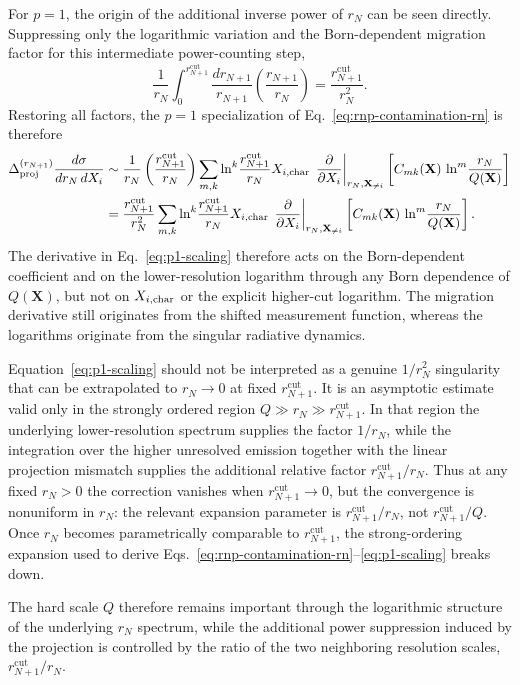 \documentclass[11pt]{article}
\newcommand{\rn}{r_N}
\newcommand{\rnp}{r_{N+1}}
\newcommand{\cut}{\mathrm{cut}}
\begin{document}
For \(p=1\), the origin of the additional inverse power of \(\rn\) can be seen directly. Suppressing only
the logarithmic variation and the Born-dependent migration factor for this intermediate power-counting step,
\[
\frac{1}{\rn}
\int_0^{\rnp^{\cut}}
\frac{d\rnp}{\rnp}
\left(\frac{\rnp}{\rn}\right)
=
\frac{\rnp^{\cut}}{\rn^2}.
\]
Restoring all factors, the \(p=1\) specialization of Eq.~\eqref{eq:rnp-contamination-rn} is therefore
\begin{align}
\Delta_{\rm proj}^{(\rnp)}
\frac{d\sigma}{d\rn\,dX_i}
&\sim
\frac{1}{\rn}
\left(\frac{\rnp^{\cut}}{\rn}\right)
\sum_{m,k}
\ln^k\!\frac{\rnp^{\cut}}{\rn}
X_{i,\rm char}\,
\left.
\frac{\partial}{\partial X_i}
\right|_{\rn,\mathbf X_{\neq i}}
\left[
C_{mk}(\mathbf X)\,
\ln^m\!\frac{\rn}{Q(\mathbf X)}
\right]
\nonumber\\
&=
\frac{\rnp^{\cut}}{\rn^2}
\sum_{m,k}
\ln^k\!\frac{\rnp^{\cut}}{\rn}
X_{i,\rm char}\,
\left.
\frac{\partial}{\partial X_i}
\right|_{\rn,\mathbf X_{\neq i}}
\left[
C_{mk}(\mathbf X)\,
\ln^m\!\frac{\rn}{Q(\mathbf X)}
\right].
\label{eq:p1-scaling}
\end{align}
The derivative in Eq.~\eqref{eq:p1-scaling} therefore acts on the Born-dependent coefficient and on the
lower-resolution logarithm through any Born dependence of \(Q(\mathbf X)\), but not on
\(X_{i,\rm char}\) or the explicit higher-cut logarithm. The migration derivative still originates from the
shifted measurement function, whereas the logarithms originate from the singular radiative dynamics.

Equation~\eqref{eq:p1-scaling} should not be interpreted as a genuine \(1/\rn^2\) singularity that can be
extrapolated to \(\rn\to0\) at fixed \(\rnp^{\cut}\). It is an asymptotic estimate valid only in the strongly
ordered region \mbox{$Q\gg\rn\gg\rnp^{\cut}$}.
In that region the underlying lower-resolution spectrum supplies
the factor \(1/\rn\), while the integration over the higher unresolved emission together with the linear
projection mismatch supplies the additional relative factor \(\rnp^{\cut}/\rn\). Thus at any fixed
\(\rn>0\) the correction vanishes when \(\rnp^{\cut}\to0\), but the convergence is nonuniform in \(\rn\):
the relevant expansion parameter is \(\rnp^{\cut}/\rn\), not \(\rnp^{\cut}/Q\). Once
\(\rn\) becomes parametrically comparable to \(\rnp^{\cut}\), the strong-ordering expansion used to derive
Eqs.~\eqref{eq:rnp-contamination-rn}--\eqref{eq:p1-scaling} breaks down.

The hard scale \(Q\) therefore remains important through the logarithmic structure of the underlying
\(\rn\) spectrum, while the additional power suppression induced by the projection is controlled by the ratio
of the two neighboring resolution scales, \(\rnp^{\cut}/\rn\).
\end{document}
